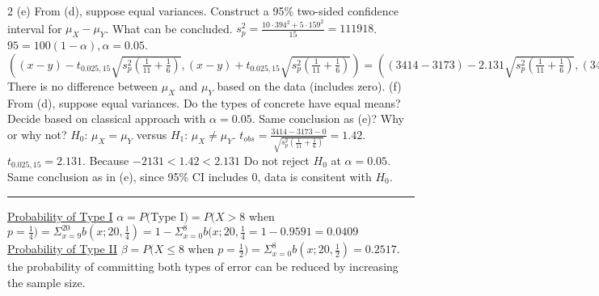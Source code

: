\documentclass[9pt]{article}
\begin{document}
\begin{multicols*}{2}
    (e) From (d), suppose equal variances. Construct a 95\% two-sided confidence interval for $\mu_X - \mu_Y$. What can be concluded.
    $s_p^2 = \frac{10\cdot 394^2+5\cdot 159^2}{15}=111918$. $95=100(1-\alpha), \alpha=0.05$. $((x-y) - t_{0.025,15}\sqrt{s_p^2(\frac{1}{11}+\frac{1}{6})}, (x-y) + t_{0.025,15}\sqrt{s_p^2(\frac{1}{11}+\frac{1}{6})}) = ((3414-3173) - 2.131\sqrt{s_p^2(\frac{1}{11}+\frac{1}{6})}, (3414-3173) + 2.131\sqrt{s_p^2(\frac{1}{11}+\frac{1}{6})}) = (-120.8, 602.8)$ There is no difference between $\mu_X$ and $\mu_Y$ based on the data (includes zero).\newline
    (f) From (d), suppose equal variances. Do the types of concrete have equal means? Decide based on classical approach with $\alpha=0.05$. Same conclusion as (e)? Why or why not?
    $H_0$: $\mu_X = \mu_Y$ versus $H_1$: $\mu_X\not= \mu_Y$. $t_{obs}=\frac{3414-3173-0}{\sqrt{s_p^2(\frac{1}{11} + \frac{1}{6})}} = 1.42$. $t_{0.025,15}=2.131$. Because $-2131 < 1.42 < 2.131$ Do not reject $H_0$ at $\alpha = 0.05$. Same conclusion as in (e), since 95\% CI includes 0, data is consitent with $H_0$.
    \rule{0.5\textwidth}{0.4pt}
    \uline{Probability of Type I} $\alpha = P($Type I$) = P(X > 8$ when $p=\frac{1}{4}) = \Sigma_{x=9}^{20}b(x;20,\frac{1}{4}) = 1 - \Sigma_{x=0}^{8}b(x;20,\frac{1}{4} = 1-0.9591 = 0.0409$\newline
    \uline{Probability of Type II} $\beta = P(X\leq 8 $ when $p=\frac{1}{2} ) = \Sigma_{x=0}^{8}b(x;20,\frac{1}{2}) = 0.2517$.\newline
    the probability of committing both types of error can be reduced by
    increasing the sample size.
\end{multicols*}
\end{document}

